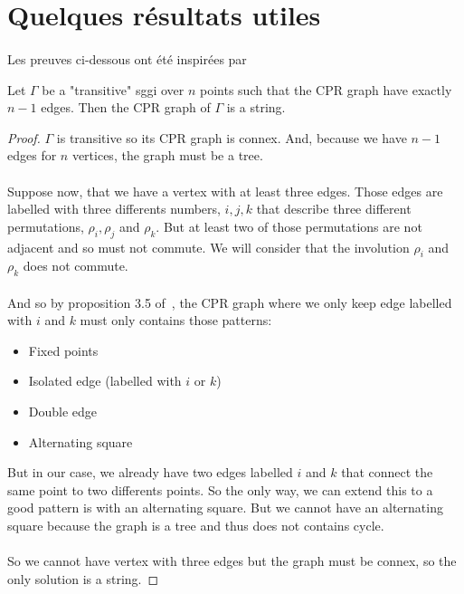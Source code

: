 \section{Quelques résultats utiles}

\paragraph{}
Les preuves ci-dessous ont été inspirées par~\cite{leemansTransactions}

\begin{lemma}
  Let $\Gamma$ be a "transitive" sggi over $n$ points such that the CPR graph have exactly $n-1$ edges. Then the CPR graph of $\Gamma$ is a string. %
\end{lemma}

\begin{proof}
  $\Gamma$ is transitive so its CPR graph is connex. And, because we have $n-1$ edges for $n$ vertices, the graph must be a tree.

  \paragraph{}
  Suppose now, that we have a vertex with at least three edges. Those edges are labelled with three differents numbers, $i, j, k$ that describe three different permutations, $\rho_i, \rho_j$ and $\rho_k$. But at least two of those permutations are not adjacent and so must not commute. We will consider that the involution $\rho_i$ and $\rho_k$ does not commute. %

  \paragraph{}
  And so by proposition 3.5 of~\cite{cprGraph}, the CPR graph where we only keep edge labelled with $i$ and $k$ must only contains those patterns:
  \begin{itemize}
    \item Fixed points
    \item Isolated edge (labelled with $i$ or $k$)
    \item Double edge
    \item Alternating square
  \end{itemize}
  But in our case, we already have two edges labelled $i$ and $k$ that connect the same point to two differents points. So the only way, we can extend this to a good pattern is with an alternating square. But we cannot have an alternating square because the graph is a tree and thus does not contains cycle.

  \paragraph{}
  So we cannot have vertex with three edges but the graph must be connex, so the only solution is a string.
\end{proof}

